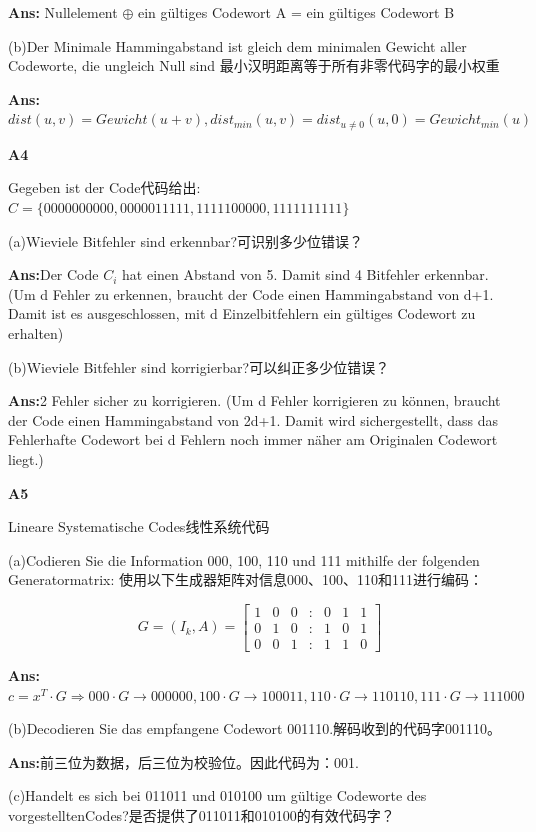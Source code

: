 \documentclass[fleqn]{article}
\begin{document}
\textbf{Ans:} Nullelement $\oplus$ ein gültiges Codewort A = ein gültiges Codewort B

(b)Der Minimale Hammingabstand ist gleich dem minimalen Gewicht aller Codeworte, die ungleich Null sind
最小汉明距离等于所有非零代码字的最小权重

\textbf{Ans:}$dist(u,v)=Gewicht(u+v),dist_{min}(u,v)=dist_{u\neq 0}(u,0)=Gewicht_{min}(u)$ 

\noindent\textbf{A4}

Gegeben ist der Code代码给出: $C=\{0000000000, 0000011111, 1111100000, 1111111111\}$

(a)Wieviele Bitfehler sind erkennbar?可识别多少位错误？

\textbf{Ans:}Der Code $C_i$ hat einen Abstand von 5. Damit sind 4 Bitfehler erkennbar.
(Um d Fehler zu erkennen, braucht der Code einen Hammingabstand von d+1. Damit ist es ausgeschlossen, mit d Einzelbitfehlern ein gültiges Codewort zu erhalten)

(b)Wieviele Bitfehler sind korrigierbar?可以纠正多少位错误？

\textbf{Ans:}2 Fehler sicher zu korrigieren.
(Um d Fehler korrigieren zu können, braucht der Code einen Hammingabstand von 2d+1. Damit wird sichergestellt, dass das Fehlerhafte Codewort bei d Fehlern noch immer näher am Originalen Codewort liegt.)

\noindent\textbf{A5}

Lineare Systematische Codes线性系统代码

(a)Codieren Sie die Information 000, 100, 110 und 111 mithilfe der folgenden Generatormatrix:
使用以下生成器矩阵对信息000、100、110和111进行编码：

$$G=(I_k,A)=\begin{bmatrix}
    1&0&0&:&0&1&1\\
    0&1&0&:&1&0&1\\
    0&0&1&:&1&1&0
\end{bmatrix}$$

\textbf{Ans:}$c=x^T\cdot G\Rightarrow 000\cdot G\rightarrow 000000,100\cdot G\rightarrow 100011,110\cdot G\rightarrow 110110,111\cdot G\rightarrow 111000$

(b)Decodieren Sie das empfangene Codewort 001110.解码收到的代码字001110。

\textbf{Ans:}前三位为数据，后三位为校验位。因此代码为：001.

(c)Handelt es sich bei 011011 und 010100 um gültige Codeworte des vorgestelltenCodes?是否提供了011011和010100的有效代码字？
\end{document}
